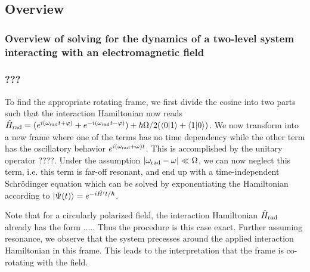 \documentclass{../lab}
\begin{document}
\subsection{Overview}
\subsubsection{Overview of solving for the dynamics of a two-level system interacting with an electromagnetic field}

\subsubsection{???}

To find the appropriate rotating frame, we first divide the cosine into two parts such that the interaction Hamiltonian now reads $\hat{H}_{\rm rad}=(e^{i(\omega_{\rm rad}t+\varphi)} + e^{-i(\omega_{\rm rad}t-\varphi)} ) + \hbar \Omega/2 (\braket{0}{1} + \braket{1}{0})$. We now transform into a new frame where one of the terms has no time dependency while the other term has the oscillatory behavior $e^{i(\omega_{\rm rad}+\omega)t}$. This is accomplished by the unitary operator ????. Under the assumption $|\omega_{\rm rad} - \omega|\ll\Omega$, we can now neglect this term, i.e. this term is far-off resonant, and end up with a time-independent Schr\"odinger equation which can be solved by exponentiating the Hamiltonian according to $\ket{\Psi(t)}=e^{-i\hat{H'}t/\hbar}$.

Note that for a circularly polarized field, the interaction Hamiltonian $\hat{H}_{\rm rad}$ already has the form ..... Thus the procedure is this case exact. Further assuming resonance, we observe that the system precesses around the applied interaction Hamiltonian in this frame. This leads to the interpretation that the frame is co-rotating with the field. 
\end{document}
